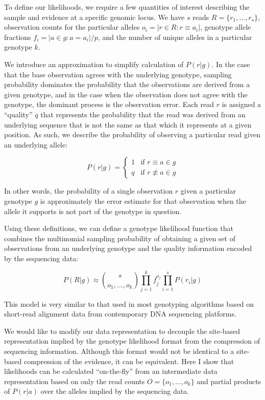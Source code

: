 \documentclass{article}
\begin{document}
To define our likelihoods, we require a few quantities of interest describing the sample and evidence at a specific genomic locus. We have $s$ reads $R = \{ r_1,\ldots,r_s \}$, observation counts for the particular alleles $o_i = |r \in R : r \equiv a_i|$, genotype allele fractions $f_i = |a \in g : a = a_i| / p$, and the number of unique alleles in a particular genotype $k$.

We introduce an approximation to simplify calculation of $P(r|g)$. In the case that the base observation agrees with the underlying genotype, sampling probability dominates the probability that the observations are derived from a given genotype, and in the case when the observation does not agree with the genotype, the dominant process is the observation error. Each read $r$ is assigned a ``quality'' $q$ that represents the probability that the read was derived from an underlying sequence that is not the same as that which it represents at a given position. As such, we describe the probability of observing a particular read given an underlying allele:

\begin{equation}
P(r|g) = 
\left\{
	\begin{array}{ll}
		1 & \mbox{if } r \equiv a \in g \\
		q & \mbox{if } r \not \equiv a \in g
	\end{array}
\right.
\end{equation}

In other words, the probability of a single observation $r$ given a particular genotype $g$ is approximately the error estimate for that observation when the allele it supports is not part of the genotype in question.

Using these definitions, we can define a genotype likelihood function that combines the multinomial sampling probability of obtaining a given set of observations from an underlying genotype and the quality information encoded by the sequencing data:

\begin{equation}
P(R|g) \approx {s \choose o_1,\ldots,o_k } 
\prod_{j=1}^k { f_j^{o_j} }
\prod_{i=1}^s { P(r_i | g) }
\end{equation}

This model is very similar to that used in most genotyping algorithms based on short-read alignment data from contemporary DNA sequencing platforms.

We would like to modify our data representation to decouple the site-based representation implied by the genotype likelihood format from the compression of sequencing information. Although this format would not be identical to a site-based compression of the evidence, it can be equivalent. Here I show that likelihoods can be calculated ``on-the-fly'' from an intermediate data representation based on only the read counts $O = \{ o_1, \ldots, o_k \}$ and partial products of $P(r|a)$ over the alleles implied by the sequencing data.
\end{document}
